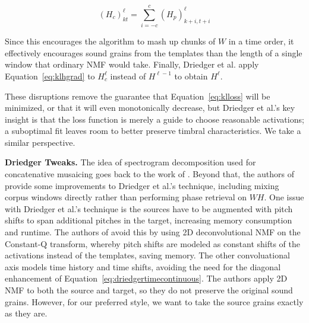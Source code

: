 \documentclass{article}
\begin{document}
\begin{equation}
    \label{eq:driedgertimecontinuous}
    (H_c)_{kt}^{\ell} = \sum_{i=-c}^c (H_p)^{\ell}_{k+i, t+i}
\end{equation}

Since this encourages the algorithm to mash up chunks of $W$ in a time order, it effectively encourages sound grains from the templates than the length of a single window that ordinary NMF would take.  Finally, Driedger et al. apply Equation~\ref{eq:klhgrad} to $H_c^{\ell}$ instead of $H^{\ell-1}$ to obtain $H^{\ell}$.

These disruptions remove the guarantee that Equation~\ref{eq:klloss} will be minimized, or that it will even monotonically decrease, but Driedger et al.'s key insight is that the loss function is merely a guide to choose reasonable activations; a suboptimal fit leaves room to better preserve timbral characteristics.  We take a similar perspective.

\textbf{Driedger Tweaks.} The idea of spectrogram decomposition used for concatenative musaicing goes back to the work of \cite{burred2013cross}.  Beyond that, the authors of \cite{buch2017nichtnegativematrixfaktorisierungnutzendesklangsynthesensystem} provide some improvements to Driedger et al.'s technique, including mixing corpus windows directly rather than performing phase retrieval on $W H$. One issue with Driedger et al.'s technique is the sources have to be augmented with pitch shifts to span additional pitches in the target, increasing memory consumption and runtime.  The authors of \cite{foroughmand2017multi, aarabi2018music} avoid this by using 2D deconvolutional NMF \cite{schmidt2006nonnegative} on the Constant-Q transform, whereby pitch shifts are modeled as constant shifts of the activations instead of the templates, saving memory.  The other convoluational axis models time history and time shifts, avoiding the need for the diagonal enhancement of Equation~\ref{eq:driedgertimecontinuous}.  The authors apply 2D NMF to both the source and target, so they do not preserve the original sound grains.  However, for our preferred style, we want to take the source grains exactly as they are.
\end{document}
